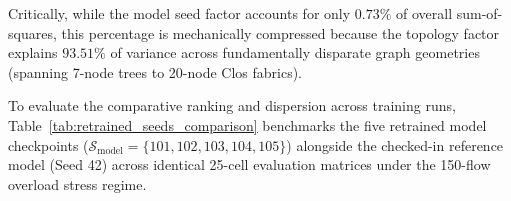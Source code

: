 \documentclass[12pt,a4paper,oneside]{report}
\begin{document}
\begin{table}[htbp]
\centering
\small
\caption{Hierarchical Variance Decomposition Across 125 Evaluations (5 Model Seeds $\times$ 5 Workloads $\times$ 5 Topologies).}
\label{tab:multiseed_variance}
\end{table}

Critically, while the model seed factor accounts for only $0.73\%$ of overall sum-of-squares, this percentage is mechanically compressed because the topology factor explains $93.51\%$ of variance across fundamentally disparate graph geometries (spanning 7-node trees to 20-node Clos fabrics). 

To evaluate the comparative ranking and dispersion across training runs, Table~\ref{tab:retrained_seeds_comparison} benchmarks the five retrained model checkpoints ($\mathcal{S}_{\mathrm{model}} = \{101, 102, 103, 104, 105\}$) alongside the checked-in reference model (Seed 42) across identical 25-cell evaluation matrices under the 150-flow overload stress regime.
\end{document}
